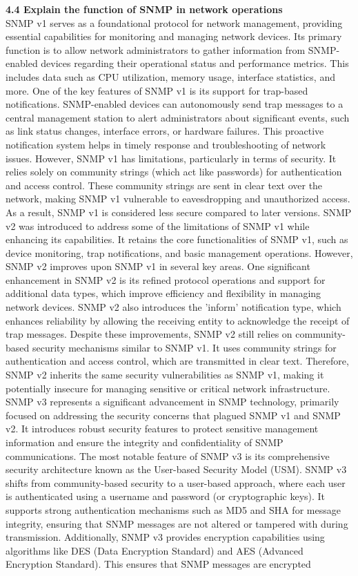 \documentclass{article}
\begin{document}
\noindent\textbf{4.4 Explain the function of SNMP in network operations}\\

	SNMP v1 serves as a foundational protocol for network management, providing essential capabilities for monitoring and managing network devices. Its primary function is to allow network administrators to gather information from SNMP-enabled devices regarding their operational status and performance metrics. This includes data such as CPU utilization, memory usage, interface statistics, and more. One of the key features of SNMP v1 is its support for trap-based notifications. SNMP-enabled devices can autonomously send trap messages to a central management station to alert administrators about significant events, such as link status changes, interface errors, or hardware failures. This proactive notification system helps in timely response and troubleshooting of network issues. However, SNMP v1 has limitations, particularly in terms of security. It relies solely on community strings (which act like passwords) for authentication and access control. These community strings are sent in clear text over the network, making SNMP v1 vulnerable to eavesdropping and unauthorized access. As a result, SNMP v1 is considered less secure compared to later versions. SNMP v2 was introduced to address some of the limitations of SNMP v1 while enhancing its capabilities. It retains the core functionalities of SNMP v1, such as device monitoring, trap notifications, and basic management operations. However, SNMP v2 improves upon SNMP v1 in several key areas. One significant enhancement in SNMP v2 is its refined protocol operations and support for additional data types, which improve efficiency and flexibility in managing network devices. SNMP v2 also introduces the 'inform' notification type, which enhances reliability by allowing the receiving entity to acknowledge the receipt of trap messages. Despite these improvements, SNMP v2 still relies on community-based security mechanisms similar to SNMP v1. It uses community strings for authentication and access control, which are transmitted in clear text. Therefore, SNMP v2 inherits the same security vulnerabilities as SNMP v1, making it potentially insecure for managing sensitive or critical network infrastructure. SNMP v3 represents a significant advancement in SNMP technology, primarily focused on addressing the security concerns that plagued SNMP v1 and SNMP v2. It introduces robust security features to protect sensitive management information and ensure the integrity and confidentiality of SNMP communications. The most notable feature of SNMP v3 is its comprehensive security architecture known as the User-based Security Model (USM). SNMP v3 shifts from community-based security to a user-based approach, where each user is authenticated using a username and password (or cryptographic keys). It supports strong authentication mechanisms such as MD5 and SHA for message integrity, ensuring that SNMP messages are not altered or tampered with during transmission. Additionally, SNMP v3 provides encryption capabilities using algorithms like DES (Data Encryption Standard) and AES (Advanced Encryption Standard). This ensures that SNMP messages are encrypted 
\end{document}
